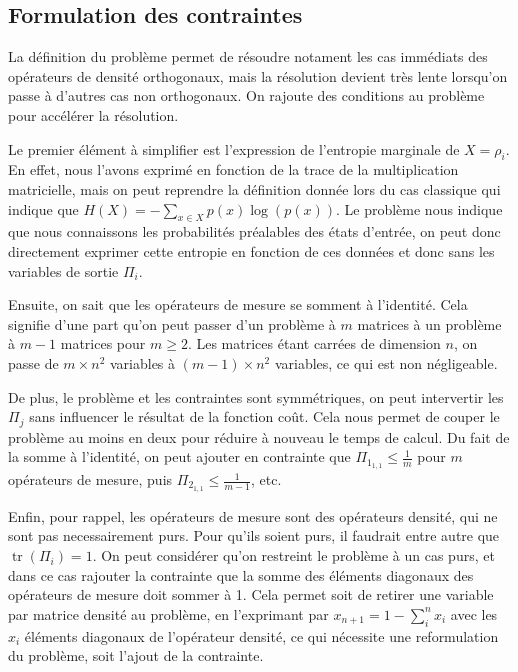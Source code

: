 \documentclass[12pt,a4paper]{article}
\DeclareMathOperator{\tr}{tr}
\begin{document}
    \medbreak

    \subsection*{Formulation des contraintes}

    La définition du problème permet de résoudre notament les cas immédiats des opérateurs de densité orthogonaux, mais la résolution devient très lente lorsqu'on passe à d'autres cas non orthogonaux. On rajoute des conditions au problème pour accélérer la résolution.

    Le premier élément à simplifier est l'expression de l'entropie marginale de $X=\rho_i$. En effet, nous l'avons exprimé en fonction de la trace de la multiplication matricielle, mais on peut reprendre la définition donnée lors du cas classique qui indique que $ H(X) = -\displaystyle \sum_{x \in X} p(x) \log(p(x))$. Le problème nous indique que nous connaissons les probabilités préalables des états d'entrée, on peut donc directement exprimer cette entropie en fonction de ces données et donc sans les variables de sortie $\Pi_i$.

    Ensuite, on sait que les opérateurs de mesure se somment à l'identité. Cela signifie d'une part qu'on peut passer d'un problème à $m$ matrices à un problème à $m-1$ matrices pour $m \geq 2$. Les matrices étant carrées de dimension $n$, on passe de $m \times n^2$ variables à $(m - 1) \times n^2$ variables, ce qui est non négligeable.

    De plus, le problème et les contraintes sont symmétriques, on peut intervertir les $\Pi_j$ sans influencer le résultat de la fonction coût. Cela nous permet de couper le problème au moins en deux pour réduire à nouveau le temps de calcul. Du fait de la somme à l'identité, on peut ajouter en contrainte que $\Pi_{1_{1, 1}} \leq \frac{1}{m}$ pour $m$ opérateurs de mesure, puis $\Pi_{2_{1, 1}} \leq \frac{1}{m-1}$, etc.

    Enfin, pour rappel, les opérateurs de mesure sont des opérateurs densité, qui ne sont pas necessairement purs. Pour qu'ils soient purs, il faudrait entre autre que $\tr(\Pi_i) = 1$. On peut considérer qu'on restreint le problème à un cas purs, et dans ce cas rajouter la contrainte que la somme des éléments diagonaux des opérateurs de mesure doit sommer à 1. Cela permet soit de retirer une variable par matrice densité au problème, en l'exprimant par $x_{n+1} = 1 - \displaystyle \sum_{i}^{n} x_i$ avec les $x_i$ éléments diagonaux de l'opérateur densité, ce qui nécessite une reformulation du problème, soit l'ajout de la contrainte.
\end{document}
